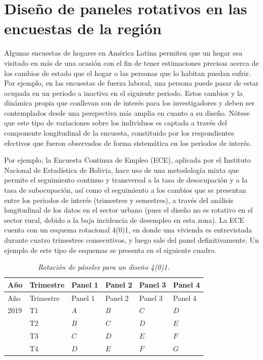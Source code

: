 \documentclass[
  10pt,
  spanish,
]{book}
\begin{document}
\hypertarget{diseuxf1o-de-paneles-rotativos-en-las-encuestas-de-la-regiuxf3n}{%
\section{Diseño de paneles rotativos en las encuestas de la región}\label{diseuxf1o-de-paneles-rotativos-en-las-encuestas-de-la-regiuxf3n}}

Algunas encuestas de hogares en América Latina permiten que un hogar sea visitado en más de una ocasión con el fin de tener estimaciones precisas acerca de los cambios de estado que el hogar o las personas que lo habitan puedan sufrir. Por ejemplo, en las encuestas de fuerza laboral, una persona puede pasar de estar ocupada en un periodo a inactiva en el siguiente periodo. Estos cambios y la dinámica propia que conllevan son de interés para los investigadores y deben ser contemplados desde una perspectiva más amplia en cuanto a su diseño. Nótese que este tipo de variaciones sobre los individuos es captada a través del componente longitudinal de la encuesta, constituido por los respondientes efectivos que fueron observados de forma sistemática en los periodos de interés.

Por ejemplo, la Encuesta Continua de Empleo (ECE), aplicada por el Instituto Nacional de Estadística de Bolivia, hace uso de una metodología mixta que permite el seguimiento continuo y transversal a la tasa de desocupación y a la tasa de subocupación, así como el seguimiento a los cambios que se presentan entre los periodos de interés (trimestres y semestres), a través del análisis longitudinal de los datos en el sector urbano (pues el diseño no es rotativo en el sector rural, debido a la baja incidencia de desempleo en esta zona). La ECE cuenta con un esquema rotacional 4(0)1, en donde una vivienda es entrevistada durante cuatro trimestres consecutivos, y luego sale del panel definitivamente. Un ejemplo de este tipo de esquemas se presenta en el siguiente cuadro.

\begin{longtable}[]{@{}llllll@{}}
\caption{\emph{Rotación de páneles para un diseño 4(0)1.}}\tabularnewline
\toprule
Año & Trimestre & Panel 1 & Panel 2 & Panel 3 & Panel 4 \\
\midrule
\endfirsthead
\toprule
Año & Trimestre & Panel 1 & Panel 2 & Panel 3 & Panel 4 \\
\midrule
\endhead
2019 & T1 & \(A\) & \(B\) & \(C\) & \(D\) \\
& T2 & \(B\) & \(C\) & \(D\) & \(E\) \\
& T3 & \(C\) & \(D\) & \(E\) & \(F\) \\
& T4 & \(D\) & \(E\) & \(F\) & \(G\) \\
\bottomrule
\end{longtable}
\end{document}
